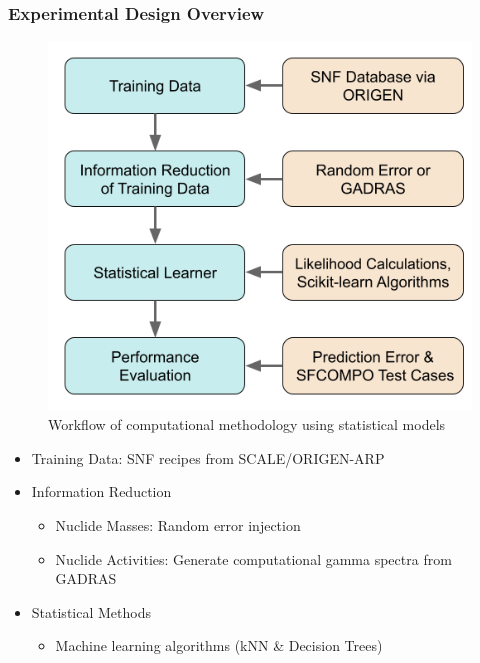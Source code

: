 \begin{frame}
  \frametitle{Experimental Design Overview}
  \begin{adjustwidth}{-10pt}{0pt}
  \begin{minipage}{0.45\textwidth}
    \begin{figure}
      \centering
      \includegraphics[height=0.5\textheight]{./figures/methodology.png}
      \caption{Workflow of computational methodology using statistical models}
    \end{figure}
  \end{minipage}%
  \hfill
  \begin{minipage}{0.58\textwidth}
    \begin{itemize}
      \item Training Data: SNF recipes from SCALE/ORIGEN-ARP \cite{scale, origen}
      \item Information Reduction
        \begin{itemize}
          \item Nuclide Masses: Random error injection
          \item Nuclide Activities: Generate computational gamma spectra from GADRAS \cite{gadras}
        \end{itemize}
      \item Statistical Methods
        \begin{itemize}
          \item Machine learning algorithms (kNN \& Decision Trees) \cite{scikit}

\end{itemize}
\end{itemize}
\end{minipage}
\end{adjustwidth}
\end{frame}
